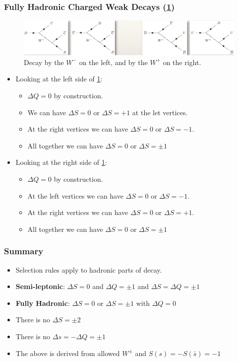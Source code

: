   
\vspace{0.5mm}
\subsubsection{Fully Hadronic Charged Weak Decays (\cref{fig: fully_hadronic_charged_weak_decays})}
\begin{figure}[ht!]
    \centering
    \includegraphics[width = .8\textwidth]{fully_hadronic_charged_weak_decays.png}
    \caption{Decay by the $W^{-}$ on the left, and by the $W^{+}$ on the right.}
    \label{fig: fully_hadronic_charged_weak_decays}
    \end{figure}

\begin{itemize} 
  \item Looking at the left side of \cref{fig: fully_hadronic_charged_weak_decays}:
  \begin{itemize}
    \item $ΔQ = 0$ by construction. 
    \item We can have $ΔS = 0$ or $ΔS = +1$ at the let vertices. 
    \item At the right vertices we can have $ΔS = 0$ or $ΔS = -1$. 
    \item All together we can have $ΔS = 0$ or $ΔS = ±1$
  \end{itemize}
  \item Looking at the right side of \cref{fig: fully_hadronic_charged_weak_decays}:
  \begin{itemize}
    \item $ΔQ = 0$ by construction.
    \item At the left vertices we can have $ΔS = 0$ or $ΔS = -1$.
    \item At the right vertices we can have $ΔS = 0$ or $ΔS = +1$.
    \item All together we can have $ΔS = 0$ or $ΔS = ±1$
  \end{itemize}
\end{itemize}

\subsubsection{Summary}
\begin{itemize}
  \item Selection rules apply to hadronic parts of decay. 
  \item \textbf{Semi-leptonic}: $ΔS = 0$ and $ΔQ = ±1$ and $ΔS = ΔQ = ±1$
  \item \textbf{Fully Hadronic}: $ΔS = 0$ or $ΔS = ±1$ with $ΔQ = 0$
  \item There is no $ΔS = ±2$
  \item There is no $Δs = -ΔQ = ±1$
  \item The above is derived from allowed $W^{±}$ and $S(s) = -S(\bar{s}) = -1$
\end{itemize}

